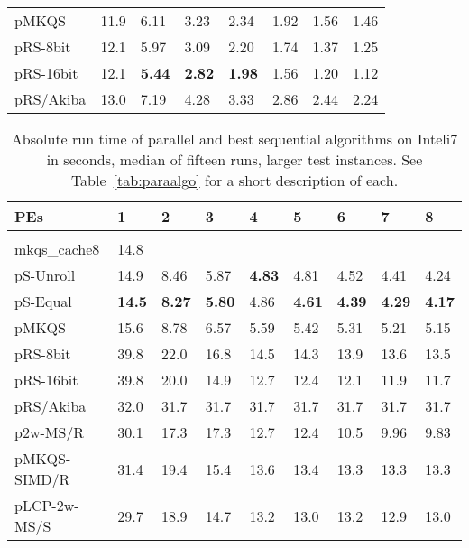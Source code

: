 \documentclass[a4paper]{myjournal}
\begin{document}
\begin{table}
\begin{tabularx}{\linewidth}{l|*{7}{>{\hfill}X}|@{}}
        pMKQS & 11.9 &     6.11 &     3.23 &     2.34 &     1.92 &     1.56 &      1.46 \\
     pRS-8bit & 12.1 &     5.97 &     3.09 &     2.20 &     1.74 &     1.37 &      1.25 \\
    pRS-16bit & 12.1 & \bf 5.44 & \bf 2.82 & \bf 1.98 &     1.56 &     1.20 &      1.12 \\
    pRS/Akiba & 13.0 &     7.19 &     4.28 &     3.33 &     2.86 &     2.44 &      2.24 \\ \hline
\end{tabularx}
\end{table}



\begin{table}\centering\small
\caption{Absolute run time of parallel and best sequential algorithms on Inteli7 in seconds, median of fifteen runs, larger test instances. See Table~\ref{tab:paraalgo} for a short description of each.}\label{tab:absrun-Inteli7}
\begin{tabularx}{\linewidth}{l|*{8}{>{\hfill}X}|@{}}
PEs & 1   & 2 & 3 & 4 & 5 & 6 & 7 & 8 \\ \hline
& \multicolumn{8}{l|}{\textbf{URLs}, , , } \\ \cline{2-9}
mkqs\_cache8 & 14.8 &  &  &  &  &  &  &  \\
pS-Unroll &     14.9 &     8.46 &     5.87 & \bf 4.83 &     4.81 &     4.52 &     4.41 &     4.24 \\
 pS-Equal & \bf 14.5 & \bf 8.27 & \bf 5.80 &     4.86 & \bf 4.61 & \bf 4.39 & \bf 4.29 & \bf 4.17 \\
        pMKQS &     15.6 &     8.78 &     6.57 &     5.59 &     5.42 &     5.31 &     5.21 &     5.15 \\
     pRS-8bit &     39.8 &     22.0 &     16.8 &     14.5 &     14.3 &     13.9 &     13.6 &     13.5 \\
    pRS-16bit &     39.8 &     20.0 &     14.9 &     12.7 &     12.4 &     12.1 &     11.9 &     11.7 \\
    pRS/Akiba &     32.0 &     31.7 &     31.7 &     31.7 &     31.7 &     31.7 &     31.7 &     31.7 \\
     p2w-MS/R &     30.1 &     17.3 &     17.3 &     12.7 &     12.4 &     10.5 &     9.96 &     9.83 \\
 pMKQS-SIMD/R &     31.4 &     19.4 &     15.4 &     13.6 &     13.4 &     13.3 &     13.3 &     13.3 \\
 pLCP-2w-MS/S &     29.7 &     18.9 &     14.7 &     13.2 &     13.0 &     13.2 &     12.9 &     13.0 \\ \hline

\end{tabularx}
\end{table}
\end{document}
